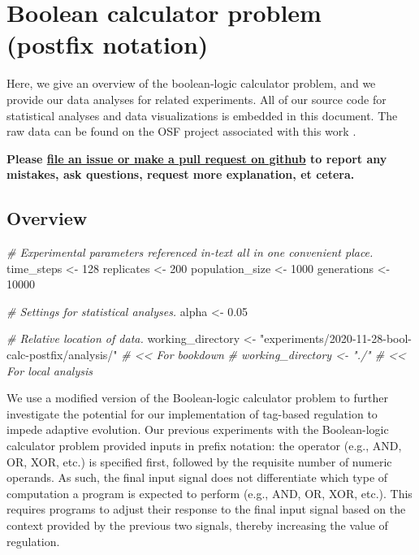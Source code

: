 \documentclass[
]{book}
\newenvironment{Shaded}{\begin{snugshade}}{\end{snugshade}}
\newcommand{\CommentTok}[1]{\textcolor[rgb]{0.56,0.35,0.01}{\textit{#1}}}
\newcommand{\DecValTok}[1]{\textcolor[rgb]{0.00,0.00,0.81}{#1}}
\newcommand{\FloatTok}[1]{\textcolor[rgb]{0.00,0.00,0.81}{#1}}
\newcommand{\NormalTok}[1]{#1}
\newcommand{\OtherTok}[1]{\textcolor[rgb]{0.56,0.35,0.01}{#1}}
\newcommand{\StringTok}[1]{\textcolor[rgb]{0.31,0.60,0.02}{#1}}
\begin{document}
\hypertarget{boolean-calculator-problem-postfix-notation}{%
\chapter{Boolean calculator problem (postfix notation)}\label{boolean-calculator-problem-postfix-notation}}

Here, we give an overview of the boolean-logic calculator problem, and we provide our data analyses for related experiments.
All of our source code for statistical analyses and data visualizations is embedded in this document.
The raw data can be found on the OSF project associated with this work \citep{Lalejini_Moreno_Ofria_Data_2020}.

\textbf{Please \href{https://github.com/amlalejini/Tag-based-Genetic-Regulation-for-LinearGP/issues}{file an issue or make a pull request on github} to report any mistakes, ask questions, request more explanation, et cetera.}

\hypertarget{overview-4}{%
\section{Overview}\label{overview-4}}

\begin{Shaded}
\begin{Highlighting}[]
\CommentTok{\# Experimental parameters referenced in{-}text all in one convenient place.}
\NormalTok{time\_steps }\OtherTok{\textless{}{-}} \DecValTok{128}
\NormalTok{replicates }\OtherTok{\textless{}{-}} \DecValTok{200}
\NormalTok{population\_size }\OtherTok{\textless{}{-}} \DecValTok{1000}
\NormalTok{generations }\OtherTok{\textless{}{-}} \DecValTok{10000}

\CommentTok{\# Settings for statistical analyses.}
\NormalTok{alpha }\OtherTok{\textless{}{-}} \FloatTok{0.05}

\CommentTok{\# Relative location of data.}
\NormalTok{working\_directory }\OtherTok{\textless{}{-}} \StringTok{"experiments/2020{-}11{-}28{-}bool{-}calc{-}postfix/analysis/"} \CommentTok{\# \textless{}\textless{} For bookdown}
\CommentTok{\# working\_directory \textless{}{-} "./"                                              \# \textless{}\textless{} For local analysis}
\end{Highlighting}
\end{Shaded}

We use a modified version of the Boolean-logic calculator problem to further investigate the potential for our implementation of tag-based regulation to impede adaptive evolution.
Our previous experiments with the Boolean-logic calculator problem provided inputs in prefix notation: the operator (e.g., AND, OR, XOR, etc.) is specified first, followed by the requisite number of numeric operands.
As such, the final input signal does not differentiate which type of computation a program is expected to perform (e.g., AND, OR, XOR, etc.).
This requires programs to adjust their response to the final input signal based on the context provided by the previous two signals, thereby increasing the value of regulation.
\end{document}
